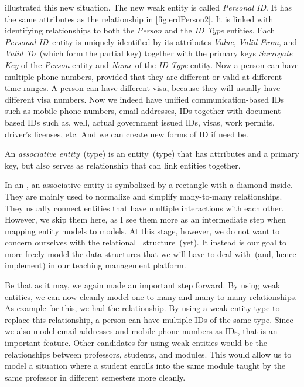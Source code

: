  illustrated this new situation.
The new weak entity is called \emph{Personal ID}.
It has the same attributes as the relationship in \cref{fig:erdPerson2}.
It is linked with identifying relationships to both the \emph{Person} and the \emph{ID Type} entities.
Each \emph{Personal ID}~entity is uniquely identified by its attributes \emph{Value}, \emph{Valid From}, and \emph{Valid To}~(which form the partial key) together with the primary keys \emph{Surrogate Key} of the \emph{Person} entity and \emph{Name} of the \emph{ID Type} entity.
Now a person can have multiple phone numbers, provided that they are different or valid at different time ranges.
A person can have different visa, because they will usually have different visa numbers.
Now we indeed have unified communication-based IDs such as mobile phone numbers, email addresses,  IDs together with document-based IDs such as, well, actual government issued IDs, visas, work permits, driver's licenses, etc.
And we can create new forms of ID if need be.%
%
\begin{definition}%
An \emph{associative entity}~(type) is an entity~(type) that has attributes and a primary key, but also serves as relationship that can link entities together.%
\end{definition}%
%
In an , an associative entity is symbolized by a rectangle with a diamond inside.
They are mainly used to normalize and simplify many-to-many relationships.
They usually connect entities that have multiple interactions with each other.
However, we skip them here, as I see them more as an intermediate step when mapping entity models to  models.
At this stage, however, we do not want to concern ourselves with the relational \db\ structure~(yet).
It instead is our goal to more freely model the data structures that we will have to deal with~(and, hence implement) in our teaching management platform.

Be that as it may, we again made an important step forward.
By using weak entities, we can now cleanly model one-to-many and many-to-many relationships.
As example for this, we had the  relationship.
By using a weak entity type to replace this relationship, a person can have multiple IDs of the same type.
Since we also model email addresses and mobile phone numbers as IDs, that is an important feature.
Other candidates for using weak entities would be the relationships between professors, students, and modules.
This would allow us to model a situation where a student enrolls into the same module taught by the same professor in different semesters more cleanly.%
\FloatBarrier%
\endhsection%
%
